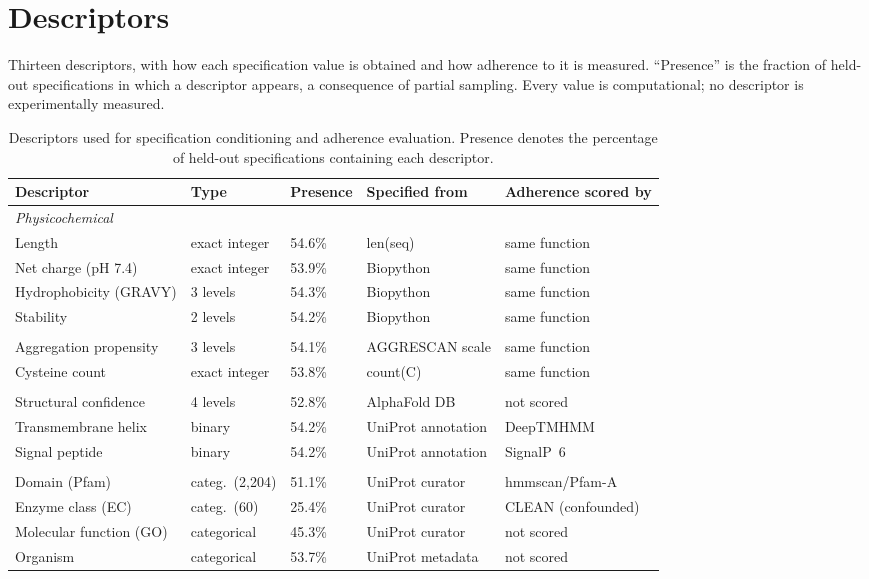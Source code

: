 \documentclass{article} %
\newcommand{\pct}{\%}
\begin{document}
\section{Descriptors}\label{app:desc}
Thirteen descriptors, with how each specification value is obtained and how
adherence to it is measured. ``Presence'' is the fraction of held-out
specifications in which a descriptor appears, a consequence of partial sampling.
Every value is computational; no descriptor is experimentally measured.


\begin{table}[h]
\caption{Descriptors used for specification conditioning and adherence
evaluation. Presence denotes the percentage of held-out specifications
containing each descriptor.}
\label{tab:descriptors}
\centering
\footnotesize
\begin{tabular}{lllll}
\toprule
Descriptor & Type & Presence & Specified from & Adherence scored by \\
\midrule
\multicolumn{5}{l}{\emph{Physicochemical}}\\
\quad Length                  & exact integer & 54.6\pct & len(seq)   & same function \\
\quad Net charge (pH 7.4)     & exact integer & 53.9\pct & Biopython           & same function \\
\quad Hydrophobicity (GRAVY)  & 3 levels      & 54.3\pct & Biopython           & same function \\
\quad Stability               & 2 levels      & 54.2\pct & Biopython           & same function \\
\addlinespace
\multicolumn{5}{l}{\emph{Developability}}\\
\quad Aggregation propensity  & 3 levels      & 54.1\pct & AGGRESCAN scale     & same function \\
\quad Cysteine count          & exact integer & 53.8\pct & count(C)   & same function \\
\addlinespace
\multicolumn{5}{l}{\emph{Structural and topological}}\\
\quad Structural confidence   & 4 levels      & 52.8\pct & AlphaFold DB        & not scored \\
\quad Transmembrane helix     & binary        & 54.2\pct & UniProt annotation  & DeepTMHMM \\
\quad Signal peptide          & binary        & 54.2\pct & UniProt annotation  & SignalP~6 \\
\addlinespace
\multicolumn{5}{l}{\emph{Functional}}\\
\quad Domain (Pfam)           & categ.\ (2{,}204) & 51.1\pct & UniProt curator & hmmscan/Pfam-A \\
\quad Enzyme class (EC)       & categ.\ (60)      & 25.4\pct & UniProt curator & CLEAN (confounded) \\
\quad Molecular function (GO) & categorical       & 45.3\pct & UniProt curator & not scored \\
\quad Organism                & categorical       & 53.7\pct & UniProt metadata & not scored \\
\bottomrule
\end{tabular}
\end{table}
\end{document}
